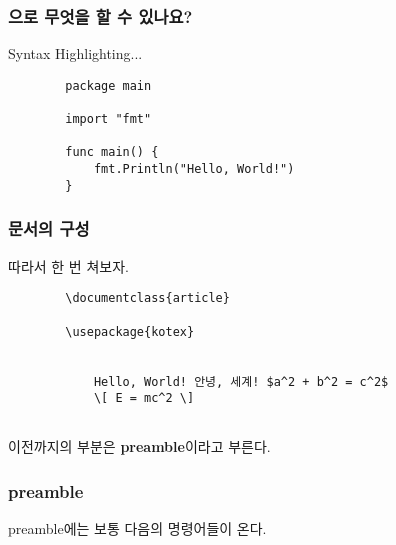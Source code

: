 \begin{frame}[fragile]
    \frametitle{\tex{}으로 무엇을 할 수 있나요?}

    Syntax Highlighting...

    \begin{verbatim}
        package main

        import "fmt"

        func main() {
            fmt.Println("Hello, World!")
        }
    \end{verbatim}

\end{frame}

\begin{frame}[fragile]
\frametitle{\latex{} 문서의 구성}

따라서 한 번 쳐보자.

\begin{verbatim}
        \documentclass{article}

        \usepackage{kotex}

        
            Hello, World! 안녕, 세계! $a^2 + b^2 = c^2$
            \[ E = mc^2 \]
        
    \end{verbatim}

\texttt{} 이전까지의 부분은 \textbf{preamble}이라고 부른다.
\end{frame}

\begin{frame}
    \frametitle{preamble}

    preamble에는 보통 다음의 명령어들이 온다.


\end{frame}


